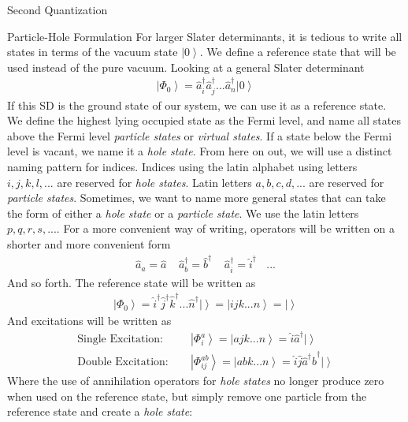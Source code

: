 \documentclass[twoside,english]{uiofysmaster}
\begin{document}
\begin{chapter}{Second Quantization}
	\begin{section}{Particle-Hole Formulation}
		For larger Slater determinants, it is tedious to write all states in terms of the vacuum state $\left| 0 \right>$. We define a reference state that will be used instead of the pure vacuum. Looking at a general Slater determinant
		\begin{align}
			\left| \Phi_0 \right> = \hat a_i^\dagger \hat a_j^\dagger ... \hat a_n^\dagger \left| 0 \right>
		\end{align}
		If this SD is the ground state of our system, we can use it as a reference state. We define the highest lying occupied state as the Fermi level, and name all states above the Fermi level \textit{particle states} or \textit{virtual states}. If a state below the Fermi level is vacant, we name it a \textit{hole state}. From here on out, we will use a distinct naming pattern for indices. Indices using the latin alphabet using letters $i, j, k, l, ...$ are reserved for \textit{hole states}. Latin letters $a, b, c, d, ...$ are reserved for \textit{particle states}. Sometimes, we want to name more general states that can take the form of either a \textit{hole state} or a \textit{particle state}. We use the latin letters $p, q, r, s, ...$. For a more convenient way of writing, operators will be written on a shorter and more convenient form
		\begin{align}
			\hat a_a = \hat a \:\:\:\:\: \hat a_b^\dagger = \hat b^\dagger \:\:\:\:\: \hat a_i^\dagger = \hat i^\dagger \:\:\:\: ...
		\end{align}
		And so forth. The reference state will be written as 
		\begin{align}
			\left| \Phi_0 \right> = \hat i^\dagger \hat j^\dagger \hat k^\dagger ... \hat n^\dagger \left| \right> = \left| ijk ... n \right> = \left| \right>
		\end{align}
		And excitations will be written as
		\begin{align}
			\text{Single Excitation: }\:\:\:\:& \left| \Phi_i^a \right> = \left| ajk ... n \right> = \hat i \hat a^\dagger \left| \right> \\
			\text{Double Excitation: }\:\:\:\:& \left| \Phi_{ij}^{ab} \right> = \left| abk ... n \right> = \hat i \hat j \hat a^\dagger \hat b^\dagger \left| \right> 
		\end{align}
		Where the use of annihilation operators for \textit{hole states} no longer produce zero when used on the reference state, but simply remove one particle from the reference state and create a \textit{hole state}:

\end{section}
\end{chapter}
\end{document}
